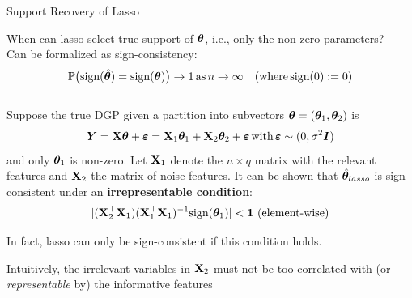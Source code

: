 \documentclass[11pt,compress,t,notes=noshow, xcolor=table]{beamer}
\begin{document}
\begin{vbframe}{Support Recovery of Lasso }
\begin{small}
When can lasso select true support of $\bm{\theta}$, i.e., only the non-zero parameters? \\
Can be formalized as sign-consistency: 
\begin{align*}
\mathbb{P}\big(\text{sign}(\hat{\bm{\theta}})=\text{sign}(\bm{\theta})\big) \to 1 \, \text{as} \, n \to \infty \quad (\text{where}\,\text{sign}(0):=0) 
\end{align*}
\\
Suppose the true DGP given a partition into subvectors $\bm{\theta}=(\bm{\theta}_1, \bm{\theta}_2)$ is 
\begin{align*}
    \bm{Y}=\mathbf{X}\bm{\theta} + \bm{\varepsilon} = \mathbf{X}_1 \bm{\theta}_1 + \mathbf{X}_2 \bm{\theta}_2 + \bm{\varepsilon}\,\text{with}\,\bm{\varepsilon}\sim (0,\sigma^2 \boldsymbol{I})
\end{align*}
and only $\bm{\theta}_1$ is non-zero.
\vspace{0.1cm}
Let $\mathbf{X}_1$ denote the $n \times q$ matrix with the relevant features and $\mathbf{X}_2$ the matrix of noise features. It can be shown that $\hat{\bm{\theta}}_{lasso}$ is sign consistent under an \textbf{irrepresentable condition}:
\begin{align*}
    \vert (\mathbf{X}_2^{\top} \mathbf{X}_1)(\mathbf{X}_1^{\top} \mathbf{X}_1)^{-1} \text{sign}(\bm{\theta}_1)\vert < \bm{1} \,\, (\text{element-wise})
\end{align*}

In fact, lasso can only be sign-consistent if this condition holds.

Intuitively, the irrelevant variables in $\mathbf{X}_2$ must not be too correlated with (or \textit{representable} by) the informative features 
\end{small}
\end{vbframe}

\endlecture
\end{document}
